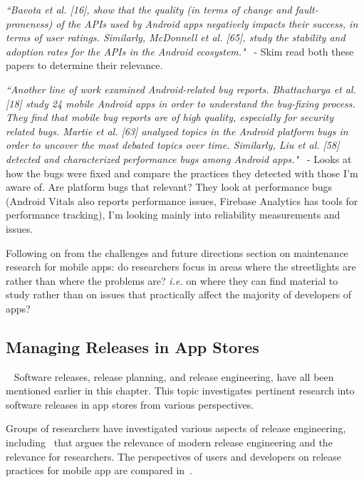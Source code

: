 \emph{``Bavota et al. [16], show that the quality (in terms of change and fault-proneness) of the APIs used by Android apps negatively impacts their success, in terms of user ratings. Similarly, McDonnell et al. [65], study the stability and adoption rates for the APIs in the Android ecosystem."}~\cite[p. 27]{nagappan2016_future_trends_in_sw_eng_for_mobile_apps} - Skim read both these papers to determine their relevance.

\emph{``Another line of work examined Android-related bug reports. Bhattacharya et al. [18] study 24 mobile Android apps in order to understand the bug-fixing process. They find that mobile bug reports are of high quality, especially for security related bugs. Martie et al. [63] analyzed topics in the Android platform bugs in order to uncover the most debated topics over time. Similarly, Liu et al. [58] detected and characterized performance bugs among Android apps."}~\cite[p. 27]{nagappan2016_future_trends_in_sw_eng_for_mobile_apps} - Looks at how the bugs were fixed and compare the practices they detected with those I'm aware of. Are platform bugs that relevant? They look at performance bugs (Android Vitals also reports performance issues, Firebase Analytics has tools for performance tracking), I'm looking mainly into reliability measurements and issues.

Following on from the challenges and future directions section on maintenance research for mobile apps: do researchers focus in areas where the streetlights are rather than where the problems are? \emph{i.e.} on where they can find material to study rather than on issues that practically affect the majority of developers of apps?




\subsection{Managing Releases in App Stores}~\label{rw-managing-releases-in-app-stores-topic}
Software releases, release planning, and release engineering, have all been mentioned earlier in this chapter. This topic investigates pertinent research into software releases in app stores from various perspectives.

Groups of researchers have investigated various aspects of release engineering, including~ that argues the relevance of modern release engineering and the relevance for researchers. The perspectives of users and developers on release practices for mobile app are compared in~.

